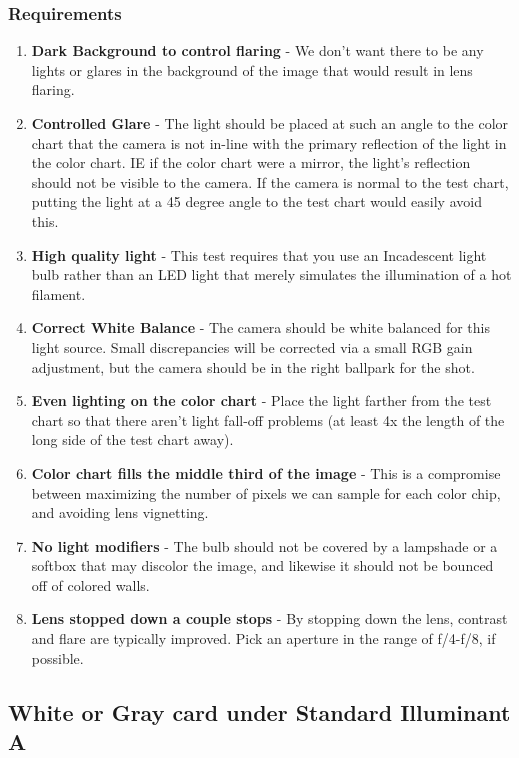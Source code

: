 \documentclass[twoside]{article}
\begin{document}
\subsubsection{Requirements}
\begin{enumerate}
    \item \textbf{Dark Background to control flaring} - We don't want there to be any lights or glares in the background of the image that would result in lens flaring.
    \item \textbf{Controlled Glare} - The light should be placed at such an angle to the color chart that the camera is not in-line with the primary reflection of the light in the color chart. IE if the color chart were a mirror, the light's reflection should not be visible to the camera. If the camera is normal to the test chart, putting the light at a 45 degree angle to the test chart would easily avoid this.
    \item \textbf{High quality light} - This test requires that you use an Incadescent light bulb rather than an LED light that merely simulates the illumination of a hot filament.
    \item \textbf{Correct White Balance} - The camera should be white balanced for this light source. Small discrepancies will be corrected via a small RGB gain adjustment, but the camera should be in the right ballpark for the shot.
    \item \textbf{Even lighting on the color chart} - Place the light farther from the test chart so that there aren't light fall-off problems (at least 4x the length of the long side of the test chart away).
    \item \textbf{Color chart fills the middle third of the image} - This is a compromise between maximizing the number of pixels we can sample for each color chip, and avoiding lens vignetting.
    \item \textbf{No light modifiers} - The bulb should not be covered by a lampshade or a softbox that may discolor the image, and likewise it should not be bounced off of colored walls.
    \item \textbf{Lens stopped down a couple stops} - By stopping down the lens, contrast and flare are typically improved. Pick an aperture in the range of f/4-f/8, if possible.
\end{enumerate}

\subsection{White or Gray card under Standard Illuminant A}
\end{document}
